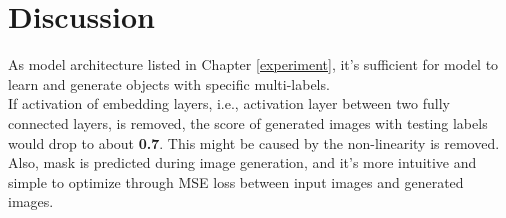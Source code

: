 \chapter{Discussion}
\indent
    As model architecture listed in Chapter \ref{experiment}, it's sufficient for model to learn 
    and generate objects with specific multi-labels. \\
    If activation of embedding layers, i.e., 
     activation layer between two fully connected layers, is removed, 
    the score of generated images with testing labels would drop to about \textbf{0.7}.
    This might be caused by the non-linearity is removed. \\
    Also, mask is predicted during image generation, and
    it's more intuitive and simple to optimize through MSE loss between input images and generated images. 